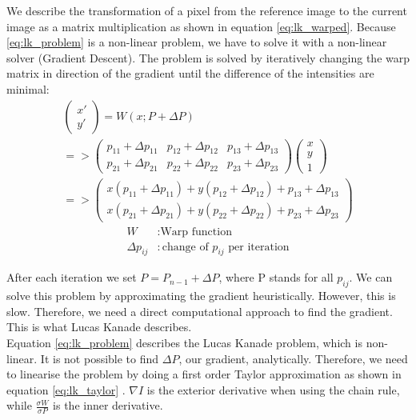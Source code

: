 \documentclass[11pt,a4paper,titlepage,oneside]{report}
\begin{document}
We describe the transformation of a pixel from the reference image to the current image as a matrix multiplication as shown in equation \ref{eq:lk_warped}. Because \ref{eq:lk_problem} is a non-linear problem, we have to solve it with a non-linear solver (Gradient Descent). The problem is solved by iteratively changing the warp matrix in direction of the gradient until the difference of the intensities are minimal:
\begin{equation}\label{eq:lk_warped}
  \begin{gathered}
    \begin{pmatrix}
      x' \\
      y'
    \end{pmatrix}=
    W(x;P+\Delta P)\\
    =>
    \begin{pmatrix}
      p_{11}+\Delta p_{11} & p_{12}+\Delta p_{12} & p_{13}+\Delta p_{13} \\
      p_{21}+\Delta p_{21} & p_{22}+\Delta p_{22} & p_{23}+\Delta p_{23}
    \end{pmatrix}
    \begin{pmatrix}
      x\\
      y\\
      1
    \end{pmatrix}\\
    =>
    \begin{pmatrix}
      x(p_{11}+\Delta p_{11}) + y(p_{12}+\Delta p_{12}) + p_{13}+\Delta p_{13} \\
      x(p_{21}+\Delta p_{21}) + y(p_{22}+\Delta p_{22}) + p_{23}+\Delta p_{23}
    \end{pmatrix}
  \end{gathered}
\end{equation}
\begin{align*}
  W               &: \text{Warp function}\\
  \Delta p_{ij}   &: \text{change of $p_{ij}$ per iteration}
\end{align*}

After each iteration we set $P=P_{n-1}+\Delta P$, where P stands for all $p_{ij}$. We can solve this problem by approximating the gradient heuristically. However, this is slow. Therefore, we need a direct computational approach to find the gradient. This is what Lucas Kanade describes.\\
Equation \ref{eq:lk_problem} describes the Lucas Kanade problem, which is non-linear. It is not possible to find $\Delta P$, our gradient, analytically. Therefore, we need to linearise the problem by doing a first order Taylor approximation as shown in equation \ref{eq:lk_taylor} \cite{taylor_series}. $\nabla I$ is the exterior derivative when using the chain rule, while $\frac{\sigma W}{\sigma P}$ is the inner derivative. 
\end{document}
